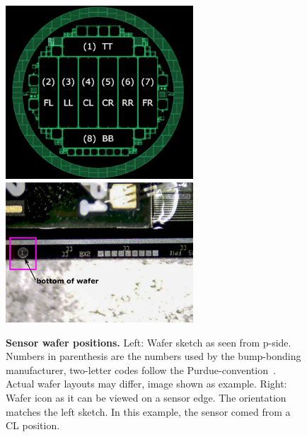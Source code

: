 \documentclass[12pt]{unlsilabsop}
\begin{document}
\begin{figure}[hH]
    \begin{center}
        \includegraphics[width=7cm]{img/SensorsWaferposPurdueconvention.png}
        \includegraphics[width=7cm]{img/SensorIDonSensor.jpg}
        \caption{\textbf{Sensor wafer positions.} Left: Wafer sketch as seen from p-side. Numbers in parenthesis are the numbers used by the bump-bonding manufacturer, two-letter codes follow the Purdue-convention~\cite{BBMnaming}. Actual wafer layouts may differ, image shown as example. Right: Wafer icon as it can be viewed on a sensor edge. The orientation matches the left sketch. In this example, the sensor comed from a CL position.}
        \label{fig:BBMwaferpos}
    \end{center}
\end{figure}
\end{document}
